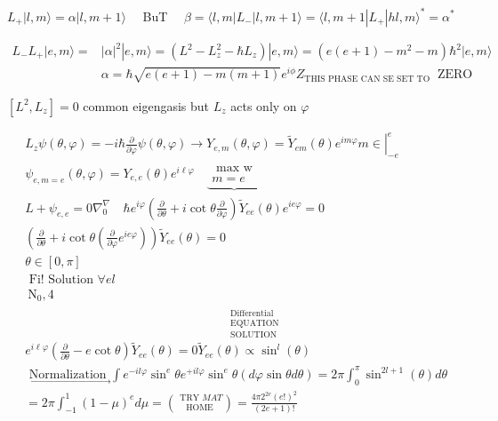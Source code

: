\documentclass[10pt]{article}
\begin{document}
$L_{+}|l, m\rangle=\alpha|l, m+1\rangle \quad$ BuT $\quad \beta=\langle l, m| L_{-}|l, m+1\rangle=\langle l, m+1| L_{+}|h l, m\rangle^{*}=\alpha^{*}$

$$
\begin{aligned}
L_{-} L_{+}|e, m\rangle= & |\alpha|^{2}|e, m\rangle=\left(L^{2}-L_{z}^{2}-\hbar L_{z}\right)|e, m\rangle=\left(e(e+1)-m^{2}-m\right) \hbar^{2}|e, m\rangle \\
& \alpha=\hbar \sqrt{e(e+1)-m(m+1)} e^{i \phi} Z_{\text {THIS PHASE CAN SE SET TO }} \text { ZERO }
\end{aligned}
$$

$\left[L^{2}, L_{z}\right]=0$ common eigengasis but $L_{z}$ acts only on $\varphi$

$$
\begin{aligned}
& L_{z} \psi(\theta, \varphi)=-i \hbar \frac{\partial}{\partial \varphi} \psi(\theta, \varphi) \rightarrow Y_{e, m}(\theta, \varphi)=\left.\tilde{Y}_{e m}(\theta) e^{i m \varphi} m \in\right|_{-e} ^{e} \\
& \psi_{e, m=e}(\theta, \varphi)=Y_{e, e}(\theta) e^{i \ell \varphi} \quad \underbrace{\substack{\text { max w } \\
m=e}} \\
& L+\psi_{e, e}=0 \nabla_{0}^{\nabla} \quad \hbar e^{i \varphi}\left(\frac{\partial}{\partial \theta}+i \cot \theta \frac{\partial}{\partial \varphi}\right) \widetilde{Y}_{e e}(\theta) e^{i e \varphi}=0 \\
& \left(\frac{\partial}{\partial \theta}+i \cot \theta\left(\frac{\partial}{\partial \varphi} e^{i e \varphi}\right)\right) \tilde{Y}_{e e}(\theta)=0 \\
& \theta \in[0, \pi] \\
& \text { Fi! Solution } \forall e l \\
& \mathrm{~N}_{0}, 4 \\
& e^{i \ell \varphi}\left(\frac{\partial}{\partial \theta}-e \cot \theta\right) \widetilde{Y}_{e e}(\theta)=0 \stackrel{\substack{\text { Differential } \\
\text { EQUATION } \\
\text { SOLUTION }}}{\tilde{Y}_{e e}(\theta) \propto \sin ^{l}(\theta)} \\
& \underset{\longrightarrow}{\text { Normalization }} \int e^{-i l \varphi} \sin ^{e} \theta e^{+i l \varphi} \sin ^{e} \theta(d \varphi \sin \theta d \theta)=2 \pi \int_{0}^{\pi} \sin ^{2 l+1}(\theta) d \theta \\
& =2 \pi \int_{-1}^{1}(1-\mu)^{e} d \mu=\binom{\text { TRY } M A T}{\text { HOME }}=\frac{4 \pi 2^{2 e}(e!)^{2}}{(2 e+1)!} \\

\end{aligned}$$
\end{document}
